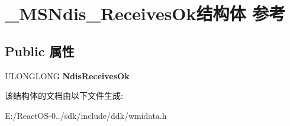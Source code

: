 \hypertarget{struct___m_s_ndis___receives_ok}{}\section{\+\_\+\+M\+S\+Ndis\+\_\+\+Receives\+Ok结构体 参考}
\label{struct___m_s_ndis___receives_ok}
\subsection*{Public 属性}
\begin{DoxyCompactItemize}
\item 
\mbox{\label{struct___m_s_ndis___receives_ok_ae99a3906b59893455162a48a879f1c96}} 
U\+L\+O\+N\+G\+L\+O\+NG {\bfseries Ndis\+Receives\+Ok}
\end{DoxyCompactItemize}


该结构体的文档由以下文件生成\+:\begin{DoxyCompactItemize}
\item 
E\+:/\+React\+O\+S-\/0../sdk/include/ddk/wmidata.\+h\end{DoxyCompactItemize}
